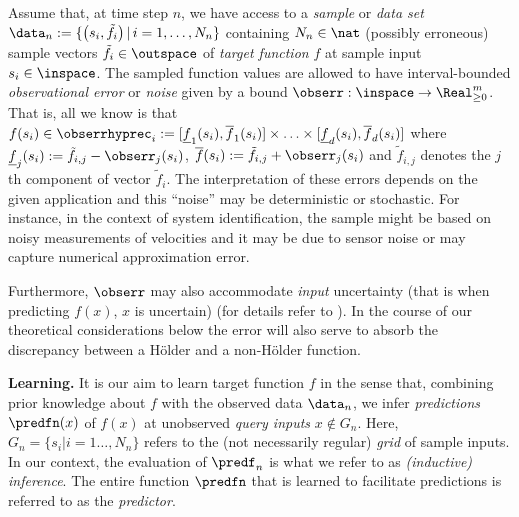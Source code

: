 Assume that, at time step $n$, we have access to a \textit{sample} or \textit{data set} $\data_n:= \{\bigl( s_i, \tilde f_i \bigr) \, \vert \, i=1,\ldots, N_n \} $ containing $N_n \in \nat$ (possibly erroneous) sample vectors $\tilde f_i \in \outspace$ of \emph{target function} $f$ at sample input $s_i \in \inspace$. 
The sampled function values are allowed to have interval-bounded \textit{observational error} or \emph{noise} given by a bound $\obserr : \inspace \to \Real^m_{\geq 0}$. That is, all we know is that $f(s_i) \in \obserrhyprec_i := [\underline f_1(s_i), \overline f_1(s_i) ] \times \ldots \times [\underline f_d(s_i), \overline f_d(s_i) ]$ where $\underline f_j(s_i) := \tilde f_{i,j} - \obserr_j(s_i)$, $\overline f(s_i) := \tilde f_{i,j} + \obserr_j(s_i)$ and $\tilde f_{i,j}$ denotes the $j$th component of vector $\tilde f_{i}$. 
The interpretation of these errors depends on the given application and this ``noise'' may be deterministic or stochastic. For instance, in the context of system identification, the sample might be based on noisy measurements of velocities and it may be due to sensor noise or may capture numerical approximation error. 

Furthermore, $\obserr$ may also accommodate \textit{input} uncertainty (that is when predicting $f(x)$, $x$ is uncertain) (for details refer to \cite{calliess2014_thesis}). In the course of our theoretical considerations below the error will also serve to absorb the discrepancy between a H\"older and a non-H\"older function.
%

\textbf{Learning.}
It is our aim to learn target function $f$ in the sense that, combining prior knowledge about $f$ with the observed data $\data_n$, we infer \textit{predictions} $\predfn(x)$ of $f(x)$ at unobserved \textit{query inputs} $x \notin G_n$. Here, $G_n =\{s_i | i =1\ldots,N_n\}$ refers to the (not necessarily regular) \emph{grid} of sample inputs. In our context, the evaluation of $\predf_n$ is what we refer to as \textit{(inductive) inference}. 
%
%
The entire function $\predfn$ that is learned to facilitate predictions is referred to as the \textit{predictor}. 

